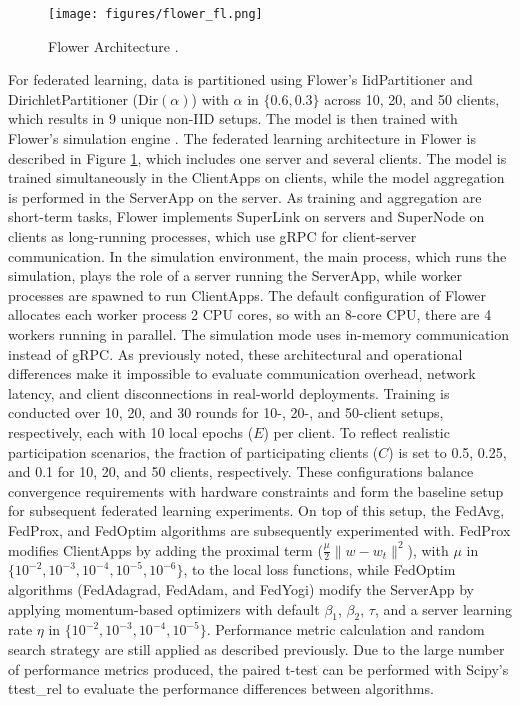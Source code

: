 \begin{figure}[h]
    \centering
    \texttt{[image: figures/flower\_fl.png]}
    \caption{Flower Architecture \citep{flower-architecture}.}
    \label{fig:flower_fl}
\end{figure}

For federated learning, data is partitioned using Flower's IidPartitioner \citep{iid_partitioner} and DirichletPartitioner \citep{dirichlet_partitioner} ($\text{Dir}(\alpha)$) with $\alpha$ in $\{0.6, 0.3\}$ across 10, 20, and 50 clients, which results in 9 unique non-IID setups. The model is then trained with Flower's simulation engine \citep{flower-simulation}. The federated learning architecture in Flower is described in Figure \ref{fig:flower_fl}, which includes one server and several clients. The model is trained simultaneously in the ClientApps on clients, while the model aggregation is performed in the ServerApp on the server. As training and aggregation are short-term tasks, Flower implements SuperLink on servers and SuperNode on clients as long-running processes, which use gRPC for client-server communication. In the simulation environment, the main process, which runs the simulation, plays the role of a server running the ServerApp, while worker processes are spawned to run ClientApps. The default configuration of Flower allocates each worker process 2 CPU cores, so with an 8-core CPU, there are 4 workers running in parallel. The simulation mode uses in-memory communication instead of gRPC. As previously noted, these architectural and operational differences make it impossible to evaluate communication overhead, network latency, and client disconnections in real-world deployments. Training is conducted over 10, 20, and 30 rounds for 10-, 20-, and 50-client setups, respectively, each with 10 local epochs ($E$) per client. To reflect realistic participation scenarios, the fraction of participating clients ($C$) is set to 0.5, 0.25, and 0.1 for 10, 20, and 50 clients, respectively. These configurations balance convergence requirements with hardware constraints and form the baseline setup for subsequent federated learning experiments. On top of this setup, the FedAvg, FedProx, and FedOptim algorithms are subsequently experimented with. FedProx modifies ClientApps by adding the proximal term ($\frac{\mu}{2} \lVert w - w_t \rVert^{2}$), with $\mu$ in $\{10^{-2}, 10^{-3}, 10^{-4}, 10^{-5}, 10^{-6}\}$, to the local loss functions, while FedOptim algorithms (FedAdagrad, FedAdam, and FedYogi) modify the ServerApp by applying momentum-based optimizers with default $\beta_1$, $\beta_2$, $\tau$, and a server learning rate $\eta$ in $\{10^{-2}, 10^{-3}, 10^{-4}, 10^{-5}\}$. Performance metric calculation and random search strategy are still applied as described previously. Due to the large number of performance metrics produced, the paired t-test can be performed with Scipy's ttest\_rel \citep{scipyttp} to evaluate the performance differences between algorithms.


